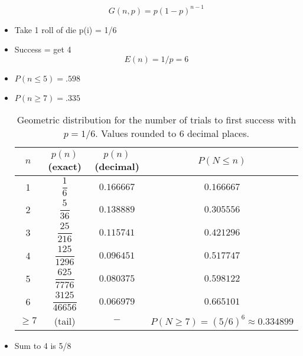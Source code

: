 \begin{itemize}
          \[ G(n,p) = p (1-p)^{n-1} \]

    \item Take 1 roll of die p(i) = 1/6
    \item Success = get 4
          \[E(n) = 1/p = 6 \]

    \item $P(n \le 5) = .598 $
    \item $P(n \ge 7) = .335$

          \begin{table}[ht]
              \centering
              \begin{tabular}{c c c c}
                  \toprule
                  $n$     & $p(n)$ (exact)        & $p(n)$ (decimal) & $P(N\le n)$                          \\
                  \midrule
                  1       & $\dfrac{1}{6}$        & $0.166667$       & $0.166667$                           \\
                  2       & $\dfrac{5}{36}$       & $0.138889$       & $0.305556$                           \\
                  3       & $\dfrac{25}{216}$     & $0.115741$       & $0.421296$                           \\
                  4       & $\dfrac{125}{1296}$   & $0.096451$       & $0.517747$                           \\
                  5       & $\dfrac{625}{7776}$   & $0.080375$       & $0.598122$                           \\
                  6       & $\dfrac{3125}{46656}$ & $0.066979$       & $0.665101$                           \\
                  \hline
                  $\ge 7$ & (tail)                & $-$              & $P(N\ge 7)=(5/6)^6 \approx 0.334899$ \\
                  \bottomrule
              \end{tabular}
              \caption{Geometric distribution for the number of trials to first success with $p=1/6$.  Values rounded to 6 decimal places.}
          \end{table}

    \item Sum to 4 is 5/8


\end{itemize}
